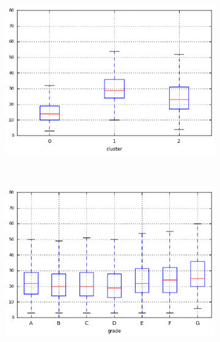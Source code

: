 \begin{anexosenv}
\begin{figure}[t!]
\begin{subfigure}[t]{0.45\textwidth}
            \centerline{\includegraphics[width=1.05\textwidth]{img/total_acc_by_cluster}}
        \end{subfigure}%
        ~ 
        \begin{subfigure}[t]{0.45\textwidth}
            \centering
   
            \centerline{\includegraphics[width=1.05\textwidth]{img/total_acc_by_grade}}

        \end{subfigure}
\\
                \caption{\emph{Boxplots} de out\textunderscore prncp}
        \begin{subfigure}[t]{0.45\textwidth}
            \centering


\end{subfigure}
\end{figure}
\end{anexosenv}
